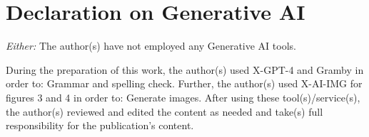 \documentclass[
]{ceurart}
\begin{document}








\section*{Declaration on Generative AI}
  {\em Either:}\newline
  The author(s) have not employed any Generative AI tools.
  \newline
  
 During the preparation of this work, the author(s) used X-GPT-4 and Gramby in order to: Grammar and spelling check. Further, the author(s) used X-AI-IMG for figures 3 and 4 in order to: Generate images. After using these tool(s)/service(s), the author(s) reviewed and edited the content as needed and take(s) full responsibility for the publication’s content. 

 


\end{document}
